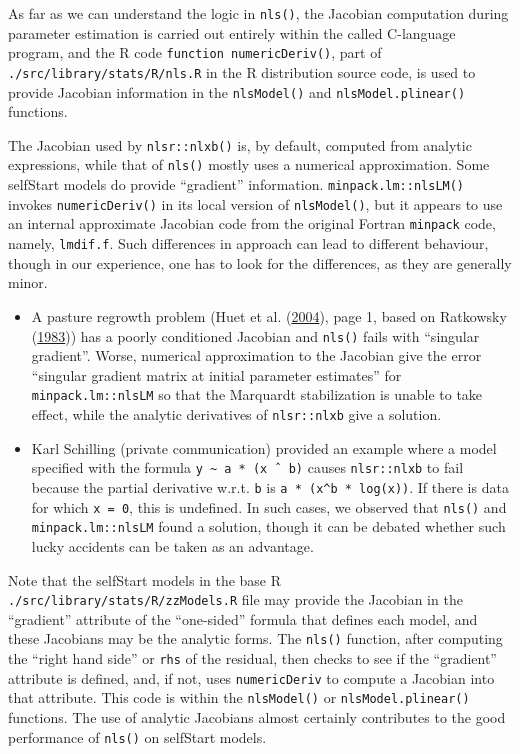 \documentclass[
]{article}
\begin{document}
As far as we can understand the logic in \texttt{nls()}, the Jacobian
computation during parameter estimation is carried out entirely within
the called C-language program, and the R code
\texttt{function\ numericDeriv()}, part of
\texttt{./src/library/stats/R/nls.R} in the R distribution source code,
is used to provide Jacobian information in the \texttt{nlsModel()} and
\texttt{nlsModel.plinear()} functions.

The Jacobian used by \texttt{nlsr::nlxb()} is, by default, computed from
analytic expressions, while that of \texttt{nls()} mostly uses a
numerical approximation. Some selfStart models do provide ``gradient''
information. \texttt{minpack.lm::nlsLM()} invokes
\texttt{numericDeriv()} in its local version of \texttt{nlsModel()}, but
it appears to use an internal approximate Jacobian code from the
original Fortran \texttt{minpack} code, namely, \texttt{lmdif.f}. Such
differences in approach can lead to different behaviour, though in our
experience, one has to look for the differences, as they are generally
minor.

\begin{itemize}
\item
  A pasture regrowth problem (Huet et al.
  (\protect\hyperlink{ref-Huet2004}{2004}), page 1, based on Ratkowsky
  (\protect\hyperlink{ref-Ratkowsky1983}{1983})) has a poorly
  conditioned Jacobian and \texttt{nls()} fails with ``singular
  gradient''. Worse, numerical approximation to the Jacobian give the
  error ``singular gradient matrix at initial parameter estimates'' for
  \texttt{minpack.lm::nlsLM} so that the Marquardt stabilization is
  unable to take effect, while the analytic derivatives of
  \texttt{nlsr::nlxb} give a solution.
\item
  Karl Schilling (private communication) provided an example where a
  model specified with the formula
  \texttt{y\ \textasciitilde{}\ a\ *\ (x\ ˆ\ b)} causes
  \texttt{nlsr::nlxb} to fail because the partial derivative w.r.t.
  \texttt{b} is \texttt{a\ *\ (x\^{}b\ *\ log(x))}. If there is data for
  which \texttt{x\ =\ 0}, this is undefined. In such cases, we observed
  that \texttt{nls()} and \texttt{minpack.lm::nlsLM} found a solution,
  though it can be debated whether such lucky accidents can be taken as
  an advantage.
\end{itemize}

Note that the selfStart models in the base R
\texttt{./src/library/stats/R/zzModels.R} file may provide the Jacobian
in the ``gradient'' attribute of the ``one-sided'' formula that defines
each model, and these Jacobians may be the analytic forms. The
\texttt{nls()} function, after computing the ``right hand side'' or
\texttt{rhs} of the residual, then checks to see if the ``gradient''
attribute is defined, and, if not, uses \texttt{numericDeriv} to compute
a Jacobian into that attribute. This code is within the
\texttt{nlsModel()} or \texttt{nlsModel.plinear()} functions. The use of
analytic Jacobians almost certainly contributes to the good performance
of \texttt{nls()} on selfStart models.
\end{document}
